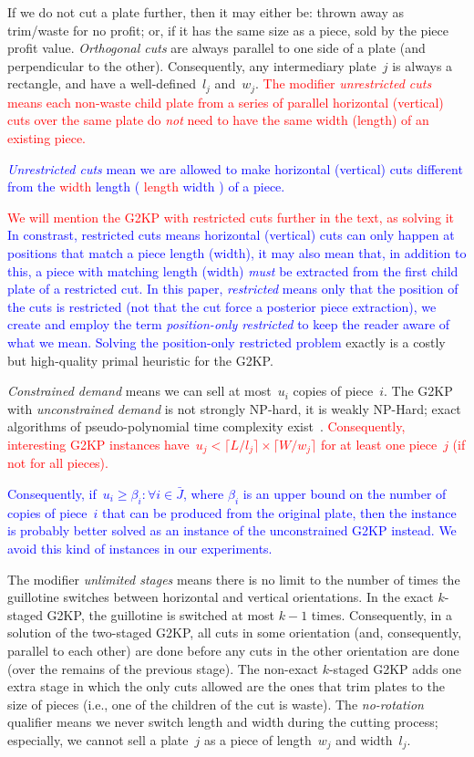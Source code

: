 \documentclass[ppgc,tese,english,formais,babel]{iiufrgs}
\newif\iffinalversion
\newcommand{\newtext}[1]{\iffinalversion%
#1%
\else%
\textcolor{blue}{#1}%
\fi%
}
\newcommand{\oldtext}[1]{\iffinalversion%
\else%
\textcolor{red}{#1}%
\fi%
}
\begin{document}
If we do not cut a plate further, then it may either be: thrown away as trim/waste for no profit; or, if it has the same size as a piece, sold by the piece profit value.
\emph{Orthogonal cuts} are always parallel to one side of a plate (and perpendicular to the other).
Consequently, any intermediary plate~\(j\) is always a rectangle, and have a well-defined~\(l_j\) and~\(w_j\).
\oldtext{The modifier \emph{unrestricted cuts} means each non-waste child plate from a series of parallel horizontal (vertical) cuts over the same plate do \emph{not} need to have the same width (length) of an existing piece.}
\newtext{\emph{Unrestricted cuts} mean we are allowed to make horizontal (vertical) cuts different from the \oldtext{width}\newtext{length} (\oldtext{length}\newtext{width}) of a piece.}
\oldtext{We will mention the G2KP with restricted cuts further in the text, as solving it}\newtext{In constrast, restricted cuts means horizontal (vertical) cuts can only happen at positions that match a piece length (width), it may also mean that, in addition to this, a piece with matching length (width) \emph{must} be extracted from the first child plate of a restricted cut. In this paper, \emph{restricted} means only that the position of the cuts is restricted (not that the cut force a posterior piece extraction), we create and employ the term \emph{position-only restricted} to keep the reader aware of what we mean. Solving the position-only restricted problem} exactly is a costly but high-quality primal heuristic for the G2KP.

\emph{Constrained demand} means we can sell at most~\(u_i\) copies of piece~\(i\).
The G2KP with \emph{unconstrained demand} is not strongly NP-hard, it is weakly NP-Hard; exact algorithms of pseudo-polynomial time complexity exist~\citep{beasley:1985:guillotine}.
\oldtext{Consequently, interesting G2KP instances have~\(u_j < \lceil L / l_j \rceil \times \lceil W / w_j \rceil \) for at least one piece~\(j\) (if not for all pieces).}
\newtext{Consequently, if~\(u_i \geq \beta_i : \forall i \in \bar{J}\), where \(\beta_i\) is an upper bound on the number of copies of piece~\(i\) that can be produced from the original plate, then the instance is probably better solved as an instance of the unconstrained G2KP instead. We avoid this kind of instances in our experiments.}
The modifier \emph{unlimited stages} means there is no limit to the number of times the guillotine switches between horizontal and vertical orientations.
In the exact \(k\)-staged G2KP, the guillotine is switched at most \(k-1\) times.
Consequently, in a solution of the two-staged G2KP, all cuts in some orientation (and, consequently, parallel to each other) are done before any cuts in the other orientation are done (over the remains of the previous stage).
The non-exact \(k\)-staged G2KP adds one extra stage in which the only cuts allowed are the ones that trim plates to the size of pieces (i.e., one of the children of the cut is waste).
The \emph{no-rotation} qualifier means we never switch length and width during the cutting process; especially, we cannot sell a plate~\(j\) as a piece of length~\(w_j\) and width~\(l_j\).
\end{document}
